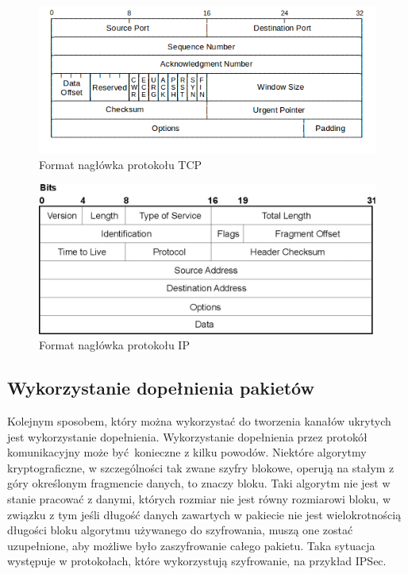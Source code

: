 \documentclass[a4paper, twoside]{report}
\begin{document}
        \begin{figure}[h]
                \centering
                \includegraphics{tcp_header}
                \caption{Format nagłówka protokołu TCP}
                \label{TCPHEADER}
        \end{figure}
        \begin{figure}[h]
                \centering
                \includegraphics{ip_header}
                \caption{Format nagłówka protokołu IP}
                \label{IPHEADER}
        \end{figure}
        \subsection{Wykorzystanie dopełnienia pakietów}
        Kolejnym sposobem, który można wykorzystać do tworzenia kanałów ukrytych
        jest wykorzystanie dopełnienia. Wykorzystanie dopełnienia przez protokół komunikacyjny
        może być konieczne z kilku powodów. Niektóre algorytmy kryptograficzne, w szczególności
        tak zwane szyfry blokowe, operują na stałym z góry określonym fragmencie danych,
        to znaczy bloku. Taki algorytm nie jest w stanie pracować z danymi, których
        rozmiar nie jest równy rozmiarowi bloku, w związku z tym jeśli długość
        danych zawartych w pakiecie nie jest wielokrotnością długości bloku
        algorytmu używanego do szyfrowania, muszą one zostać uzupełnione, aby możliwe
        było zaszyfrowanie całego pakietu. Taka sytuacja występuje w protokołach,
        które wykorzystują szyfrowanie, na przykład IPSec\cite{IPSECPADDING}.
\end{document}
